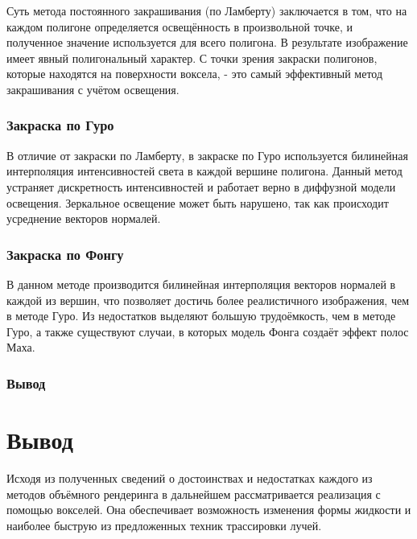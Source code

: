 Суть метода постоянного закрашивания (по Ламберту) заключается в том, что
на каждом полигоне определяется освещённость в произвольной точке, и полученное значение
используется для всего полигона\cite{site:fill}. В результате изображение имеет явный полигональный характер.
С точки зрения закраски полигонов, которые находятся на поверхности воксела, - это самый эффективный метод закрашивания с учётом освещения\cite{site:fill}.

\subsubsection{Закраска по Гуро}

В отличие от закраски по Ламберту, в закраске по Гуро используется билинейная интерполяция
интенсивностей света в каждой вершине полигона. Данный метод устраняет дискретность интенсивностей и работает верно в диффузной модели освещения. Зеркальное освещение может быть нарушено, так как происходит усреднение
векторов нормалей\cite{site:fill}.

\subsubsection{Закраска по Фонгу}

В данном методе производится билинейная интерполяция векторов нормалей в каждой из вершин, что
позволяет достичь более реалистичного изображения, чем в методе Гуро. Из недостатков выделяют
большую трудоёмкость, чем в методе Гуро, а также существуют случаи, в которых модель Фонга создаёт
эффект полос Маха\cite{site:fill}.

\subsubsection{Вывод}


\section{Вывод}

Исходя из полученных сведений о достоинствах и недостатках каждого из методов объёмного
рендеринга в дальнейшем рассматривается реализация с помощью вокселей. Она обеспечивает
возможность изменения формы жидкости и наиболее быструю из предложенных техник трассировки лучей.

